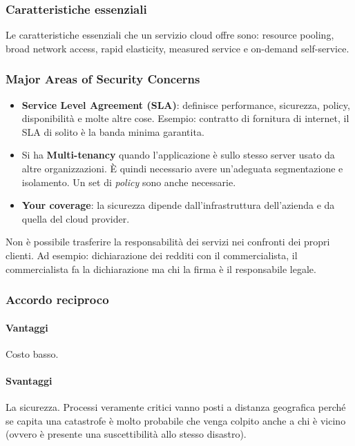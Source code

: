 \subsubsection{Caratteristiche essenziali}

Le caratteristiche essenziali che un servizio cloud offre sono: resource 
pooling, broad network access, rapid elasticity, measured service e on-demand 
self-service.

\subsubsection{Major Areas of Security Concerns}

\begin{itemize}
 \item \textbf{Service Level Agreement (SLA)}: definisce performance,
sicurezza, policy, disponibilità e molte altre cose. Esempio: contratto di
fornitura di internet, il SLA di solito è la banda minima garantita.

 \item Si ha \textbf{Multi-tenancy} quando l'applicazione è sullo stesso server
usato da altre organizzazioni. È quindi necessario avere un'adeguata
segmentazione e isolamento. Un set di \textit{policy} sono anche necessarie.

 \item \textbf{Your coverage}: la sicurezza dipende dall'infrastruttura
dell'azienda e da quella del cloud provider.
\end{itemize}

Non è possibile trasferire la responsabilità dei servizi nei confronti dei
propri clienti. Ad esempio: dichiarazione dei redditi con il commercialista, il
commercialista fa la dichiarazione ma chi la firma è il responsabile legale.

\subsubsection{Accordo reciproco}

\paragraph*{Vantaggi} Costo basso.

\paragraph*{Svantaggi}La sicurezza. Processi veramente critici vanno posti a
distanza geografica perché se capita una catastrofe è molto probabile che venga
colpito anche a chi è vicino (ovvero è presente una suscettibilità allo stesso
disastro).
